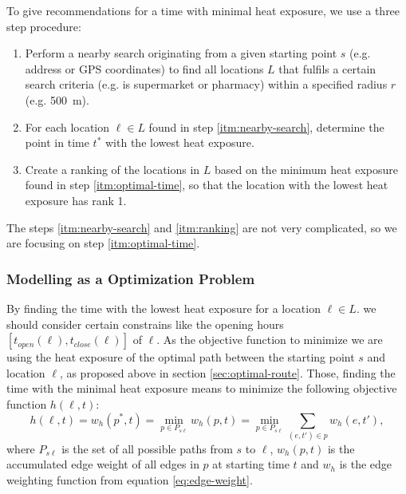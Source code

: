  To give recommendations for a time with minimal heat exposure, we use a three step procedure: 
 
 \begin{enumerate}
 	\item \label{itm:nearby-search} Perform a nearby search originating from a given starting point $s$  (e.g. address or GPS coordinates) to find all locations $L$ that fulfils a certain search criteria (e.g. is supermarket or pharmacy)  within a specified radius $r$ (e.g. \SI{500}{\meter}).
 	
 	\item \label{itm:optimal-time} For each location $\ell \in L$ found in step \ref{itm:nearby-search}, determine the point in time $t^*$ with the lowest heat exposure. 
 	
 	\item \label{itm:ranking} Create a ranking of the locations in $L$ based on the minimum heat exposure found in step \ref{itm:optimal-time}, so that the location with the lowest heat exposure has rank 1.
 \end{enumerate} 

The steps \ref{itm:nearby-search} and \ref{itm:ranking} are not very complicated, so we are focusing on step \ref{itm:optimal-time}. 

\subsubsection{Modelling as a Optimization Problem} 

By finding the time with the lowest heat exposure for a location $\ell \in L$. we should consider certain constrains like the opening hours $[t_{open}(\ell),t_{close}(\ell)]$ of $\ell$. As the objective function to minimize we are using the heat exposure of the optimal path between the starting point $s$ and location $\ell$, as proposed above in section \ref{sec:optimal-route}. Those, finding the time with the minimal heat exposure means to minimize the following objective function $h(\ell, t)$:
	\begin{equation}\label{eq:objective-funtion}
		h(\ell, t) = w_h(p^*, t) = \min_{p\in P_{s\ell}} w_h(p, t) = \min_{p\in P_{s\ell}} \sum_{(e, t') \in p} w_h(e, t'),
	\end{equation}
where $P_{s\ell}$ is the set of all possible paths from $s$ to $\ell$,  $w_h(p, t)$ is the accumulated edge weight of all edges in $p$ at starting time $t$ and $w_h$ is the edge weighting function from equation \eqref{eq:edge-weight}. 

